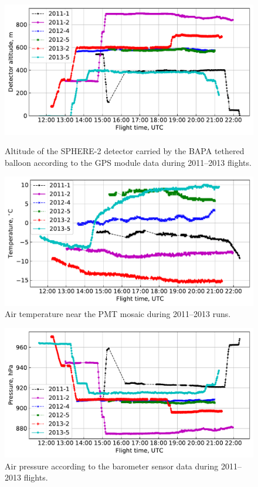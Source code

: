 \documentclass[final,5p,times,twocolumn]{elsarticle}
\begin{document}
\begin{figure}[thb]    
    \begin{minipage}[t]{0.48\textwidth}
    \centering
 \includegraphics[width=\textwidth]{Telemetry_height.pdf}
    \caption{Altitude of the SPHERE-2 detector carried by the BAPA tethered balloon according to the GPS module data during 2011--2013 flights.}
    \label{fig:height}
    
    \end{minipage}
    \hfill
    \begin{minipage}[t]{0.48\textwidth}
    \centering
\includegraphics[width=\textwidth]{Telemetry_tmos.pdf}
    \caption{Air temperature near the PMT mosaic during 2011--2013 runs.}
    \label{fig:temperature}
    
    \end{minipage}
\end{figure}

\begin{figure}[tb]
    \includegraphics[width=.48\textwidth]{Telemetry_pressure.pdf}
    \caption{Air pressure according to the barometer sensor data during 2011--2013 flights.}
    \label{fig:pressure}
\end{figure}
\end{document}
